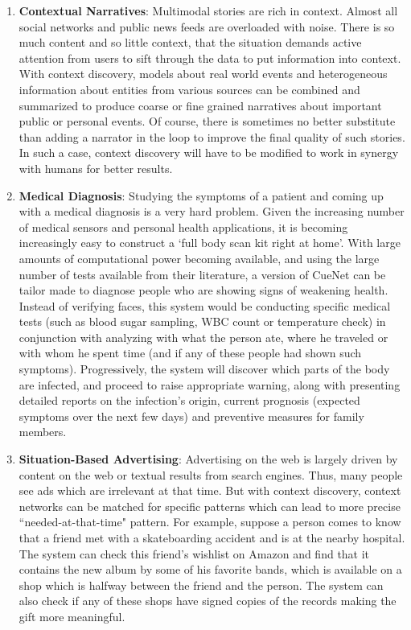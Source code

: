 \begin{enumerate}
  \item \textbf{Contextual Narratives}: Multimodal stories are rich in context. Almost all social networks and public news feeds are overloaded with noise. There is so much content and so little context, that the situation demands active attention from users to sift through the data to put information into context. With context discovery, models about real world events and heterogeneous information about entities from various sources can be combined and summarized to produce coarse or fine grained narratives about important public or personal events. Of course, there is sometimes no better substitute than adding a narrator in the loop to improve the final quality of such stories. In such a case, context discovery will have to be modified to work in synergy with humans for better results.

  \item \textbf{Medical Diagnosis}: Studying the symptoms of a patient and coming up with a medical diagnosis is a very hard problem. Given the increasing number of medical sensors and personal health applications, it is becoming increasingly easy to construct a `full body scan kit right at home'. With large amounts of computational power becoming available, and using the large number of tests available from their literature, a version of CueNet can be tailor made to diagnose people who are showing signs of weakening health. Instead of verifying faces, this system would be conducting specific medical tests (such as blood sugar sampling, WBC count or temperature check) in conjunction with analyzing with what the person ate, where he traveled or with whom he spent time (and if any of these people had shown such symptoms). Progressively, the system will discover which parts of the body are infected, and proceed to raise appropriate warning, along with presenting detailed reports on the infection's origin, current prognosis (expected symptoms over the next few days) and preventive measures for family members.

  \item \textbf{Situation-Based Advertising}: Advertising on the web is largely driven by content on the web or textual results from search engines. Thus, many people see ads which are irrelevant at that time. But with context discovery, context networks can be matched for specific patterns which can lead to more precise ``needed-at-that-time" pattern. For example, suppose a person comes to know that a friend met with a skateboarding accident and is at the nearby hospital. The system can check this friend's wishlist on Amazon and find that it contains the new album by some of his favorite bands, which is available on a shop which is halfway between the friend and the person. The system can also check if any of these shops have signed copies of the records making the gift more meaningful.


\end{enumerate}

